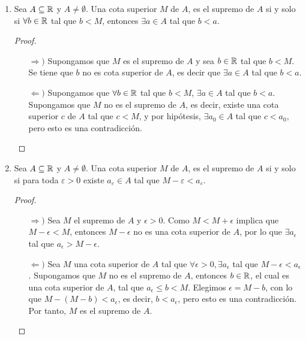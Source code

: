 \begin{enumerate}[label=\roman*)]
 \begin{proof} 
  Supongamos que $m_1$ y $m_2$ son ínfimos de $A$. Por definición, $m_1$ es una cota inferior de $A$ y $m_2$ es elemento ínfimo, entonces $m_1\leq m_2$. Análogamente, $m_2\leq m_1$. Por tanto, $m_1=m_2$. 
 \end{proof}
 
 \item Sea $A\subseteq \mathbb{R}$ y $A\neq \emptyset$. Una cota superior $M$ de $A$, es el supremo de $A$ si y solo si $\forall b\in \mathbb{R}$ tal que $b<M$, entonces $\exists a\in A$ tal que $b<a$.
 \begin{proof}\leavevmode
 \begin{itemize}
 \item[$\Rightarrow)$] Supongamos que $M$ es el supremo de $A$ y sea $b\in \mathbb{R}$ tal que $b<M$. Se tiene que $b$ no es cota superior de $A$, es decir que $\exists a\in A$ tal que $b<a$.
 \item[$\Leftarrow)$] Supongamos que $\forall b\in \mathbb{R}$ tal que $b<M$, $\exists a\in A$ tal que $b<a$. Supongamos que $M$ no es el supremo de $A$, es decir, existe una cota superior $c$ de $A$ tal que $c<M$, y por hipótesis, $\exists a_0\in A$ tal que $c<a_0$, pero esto es una contradicción. \qedhere
 \end{itemize}
 \end{proof}

 \item Sea $A\subseteq \mathbb{R}$ y $A\neq \emptyset$. Una cota superior $M$ de $A$, es el supremo de $A$ si y solo si para toda $\varepsilon>0$ existe $a_\varepsilon \in A$ tal que $M-\varepsilon<a_\varepsilon$.

  \begin{proof}\leavevmode
  \begin{itemize}
  \item[$\Rightarrow)$] Sea $M$ el supremo de $A$ y $\epsilon>0$. Como $M<M+\epsilon$ implica que $M-\epsilon<M$, entonces $M-\epsilon$ no es una cota superior de $A$, por lo que $\exists a_\epsilon$ tal que $a_\epsilon>M-\epsilon$.
  \item[$\Leftarrow)$] Sea $M$ una cota superior de $A$ tal que $\forall \epsilon>0, \exists a_{\epsilon}$ tal que $M-\epsilon<a_{\epsilon}$. Supongamos que $M$ no es el supremo de $A$, entonces $b\in \mathbb{R}$, el cual es una cota superior de $A$, tal que $a_\epsilon \leq b < M$. Elegimos $\epsilon = M-b$, con lo que $M-(M-b)<a_\epsilon$, es decir, $b<a_{\epsilon}$, pero esto es una contradicción. Por tanto, $M$ es el supremo de $A$. \qedhere
  \end{itemize}
  \end{proof}
  

\end{enumerate}
